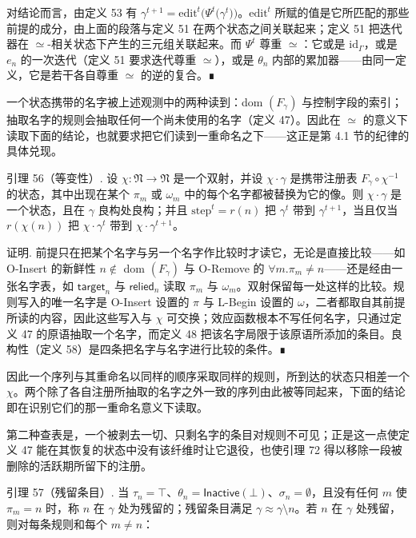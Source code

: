 对结论而言，由定义 53 有 $\gamma ^ { t + 1 } = \mathrm { e d i t } ^ { t } \big ( \Psi ^ { t } \big ( \gamma ^ { t } \big ) \big )$。$\mathrm{edit}^{t}$ 所赋的值是它所匹配的那些前提的成分，由上面的段落与定义 51 在两个状态之间关联起来；定义 51 把迭代器在 $\simeq$-相关状态下产生的三元组关联起来。而 $\Psi ^ { t }$ 尊重 $\simeq$：它或是 $\mathrm { i d } _ { \Gamma }$，或是 $e _ { n }$ 的一次迭代（定义 51 要求迭代尊重 $\simeq$），或是 $\theta _ { n }$ 内部的累加器——由同一定义，它是若干各自尊重 $\simeq$ 的逆的复合。∎

一个状态携带的名字被上述观测中的两种读到：dom $\left( F _ { \gamma } \right)$ 与控制字段的索引；抽取名字的规则会抽取任何一个尚未使用的名字（定义 47）。因此在 $\simeq$ 的意义下读取下面的结论，也就要求把它们读到一重命名之下——这正是第 4.1 节的纪律的具体兑现。

引理 56（等变性）. 设 $\chi : \mathfrak { N } \to \mathfrak { N }$ 是一个双射，并设 $\chi \cdot \gamma$ 是携带注册表 $F _ { \gamma } \circ \chi ^ { - 1 }$ 的状态，其中出现在某个 $\pi _ { m }$ 或 $\omega _ { m }$ 中的每个名字都被替换为它的像。则 $\chi \cdot \gamma$ 是一个状态，且在 $\gamma$ 良构处良构；并且 $\mathrm { s t e p } ^ { t } = r ( n )$ 把 $\gamma ^ { t }$ 带到 $\gamma ^ { t + 1 }$，当且仅当 $r ( \chi ( n ) )$ 把 $\chi \cdot \gamma ^ { t }$ 带到 $\chi \cdot \gamma ^ { t + 1 }$。

证明. 前提只在把某个名字与另一个名字作比较时才读它，无论是直接比较——如 O-Insert 的新鲜性 $n \not \in$ dom $\left( F _ { \gamma } \right)$ 与 O-Remove 的 $\forall m. \pi _ { m } \neq n$——还是经由一张名字表，如 $\mathsf{target}_{n}$ 与 $\mathsf{relied}_{n}$ 读取 $\pi _ { m }$ 与 $\omega _ { m }$。双射保留每一处这样的比较。规则写入的唯一名字是 O-Insert 设置的 $\pi$ 与 L-Begin 设置的 $\omega$，二者都取自其前提所读的内容，因此这些写入与 $\chi$ 可交换；效应函数根本不写任何名字，只通过定义 47 的原语抽取一个名字，而定义 48 把该名字局限于该原语所添加的条目。良构性（定义 58）是四条把名字与名字进行比较的条件。∎

因此一个序列与其重命名以同样的顺序采取同样的规则，所到达的状态只相差一个 $\chi$。两个除了各自注册所抽取的名字之外一致的序列由此被等同起来，下面的结论即在识别它们的那一重命名意义下读取。

第二种查表是，一个被剥去一切、只剩名字的条目对规则不可见；正是这一点使定义 47 能在其恢复的状态中没有该纤维时让它退役，也使引理 72 得以移除一段被删除的活跃期所留下的注册。

引理 57（残留条目）. 当 $\tau _ { n } = \top$、$\theta _ { n } = \mathsf { I n a c t i v e } ( \bot )$、$\sigma _ { n } = \emptyset$，且没有任何 $m$ 使 $\pi _ { m } = n$ 时，称 $n$ 在 $\gamma$ 处为残留的；残留条目满足 $\gamma \approx \gamma \setminus n$。若 $n$ 在 $\gamma$ 处残留，则对每条规则和每个 $m \neq n$：

